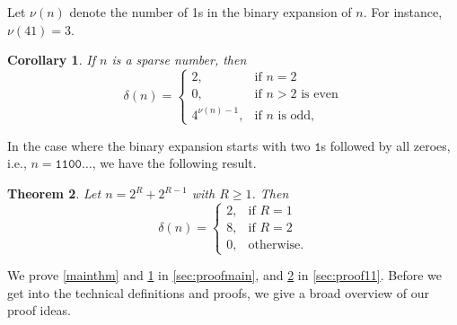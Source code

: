 \documentclass[12pt]{amsart}
\newtheorem{theorem}{Theorem}[section]
\newtheorem{corollary}[theorem]{Corollary}
\theoremstyle{definition}
\numberwithin{equation}{section}
\begin{document}
Let $\nu(n)$ denote the number of 1s in the binary expansion of $n$. For instance, $\nu(41) = 3$.
\begin{corollary}\label{maincor}
If $n$ is a sparse number, then
\[
\delta(n) = \begin{cases}
2\text{,} & \text{if }n = 2\\
0, &\text{if } n > 2 \text{ is even}\\
4^{\nu(n) - 1}, & \text{if } n\text{ is odd},
\end{cases}
\]
\end{corollary}
In the case where the binary expansion starts with two $\mathtt{1}$s followed by all zeroes, i.e., $n =\texttt{1100}\ldots$, we have the following result.
\begin{theorem}\label{11thm}
Let $n = 2^R + 2^{R-1}$ with $R\geq 1$. Then 
\[
\delta(n) = \begin{cases}
2, & \text{if } R = 1\\
8, & \text{if } R = 2\\
0, & \text{otherwise}.
\end{cases}
\]
\end{theorem}
We prove \cref{mainthm} and \cref{maincor} in \cref{sec:proofmain}, and \cref{11thm} in \cref{sec:proof11}. Before we get into the technical definitions and proofs, we give a broad overview of our proof ideas.

\end{document}
